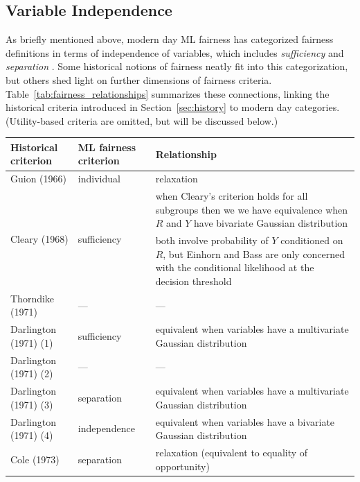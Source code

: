 \documentclass[sigconf,letterpaper,9pt]{acmart}
\begin{document}
\subsection{Variable Independence}

As briefly mentioned above, modern day ML fairness has categorized fairness definitions in terms of independence of variables, which includes {\em sufficiency} and {\em separation} \cite{barocas2018fairness}. Some historical notions of fairness neatly fit into this categorization, but others shed light on further dimensions of fairness criteria.  Table~\ref{tab:fairness_relationships} summarizes these connections, linking the historical criteria
introduced in Section~\ref{sec:history} to modern day categories. (Utility-based criteria are omitted, but will be discussed below.)  

\begin{table}
\renewcommand{\arraystretch}{1.15}
\small
\begin{tabular}{p{5cm}p{3.25cm}p{8.5cm}}
\toprule
\bf Historical criterion & \bf ML fairness criterion & \bf Relationship \\
\bottomrule
Guion (1966) & {\sc individual} & relaxation \\
\hline
\multirow{2}{*}{Cleary (1968)} & \multirow{2}{*}{{\sc sufficiency}} & when Cleary's criterion holds for
all subgroups then we we have equivalence when $R$ and $Y$ have
bivariate Gaussian distribution\\
\hline
\multirow{2}{*}{Einhorn and Bass (1971)} &
\multirow{2}{*}{{\sc sufficiency}} &
both involve probability of $Y$ conditioned on $R$, but 
Einhorn and Bass are only concerned with the conditional likelihood
at the decision threshold\\
\hline
Thorndike (1971) & --- & --- \\
\hline
Darlington (1971) (1) & {\sc sufficiency} &
equivalent when variables have a multivariate Gaussian  distribution \\
Darlington (1971) (2) & --- & --- \\
Darlington (1971) (3) & {\sc separation} & equivalent when variables have a multivariate Gaussian  distribution\\
Darlington (1971) (4) & {\sc independence} & equivalent when variables have a bivariate Gaussian  distribution\\
\hline 
Cole (1973) &
{\sc separation} & relaxation (equivalent to equality of opportunity) \\

\end{tabular}
\end{table}
\end{document}
